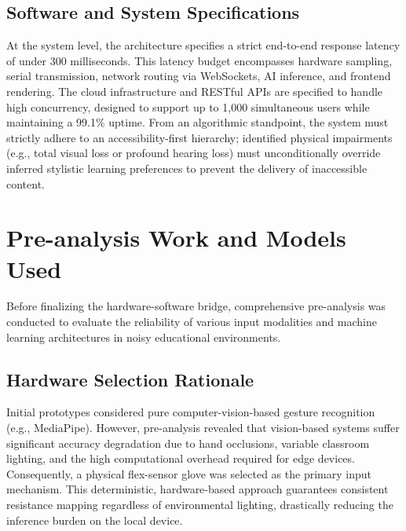 \subsection{Software and System Specifications}
At the system level, the architecture specifies a strict end-to-end response latency of under 300 milliseconds. This latency budget encompasses hardware sampling, serial transmission, network routing via WebSockets, AI inference, and frontend rendering. The cloud infrastructure and RESTful APIs are specified to handle high concurrency, designed to support up to 1,000 simultaneous users while maintaining a 99.1\% uptime. From an algorithmic standpoint, the system must strictly adhere to an accessibility-first hierarchy; identified physical impairments (e.g., total visual loss or profound hearing loss) must unconditionally override inferred stylistic learning preferences to prevent the delivery of inaccessible content.

\section{Pre-analysis Work and Models Used}
\label{sec:pre_analysis}
Before finalizing the hardware-software bridge, comprehensive pre-analysis was conducted to evaluate the reliability of various input modalities and machine learning architectures in noisy educational environments.

\subsection{Hardware Selection Rationale}
Initial prototypes considered pure computer-vision-based gesture recognition (e.g., MediaPipe). However, pre-analysis revealed that vision-based systems suffer significant accuracy degradation due to hand occlusions, variable classroom lighting, and the high computational overhead required for edge devices. Consequently, a physical flex-sensor glove was selected as the primary input mechanism. This deterministic, hardware-based approach guarantees consistent resistance mapping regardless of environmental lighting, drastically reducing the inference burden on the local device.

